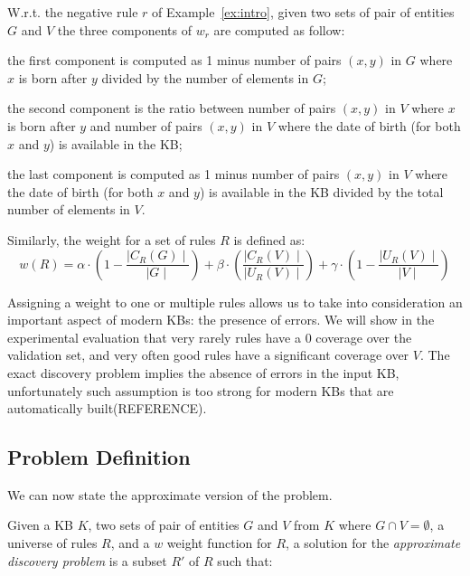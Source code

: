 \begin{myExample}
	W.r.t. the negative rule $r$ of Example~\ref{ex:intro}, given two sets of pair of entities $G$ and $V$ the three components of $w_r$ are computed as follow:
	\begin{inparaenum}[\itshape(i)]
		\item the first component is computed as 1 minus number of pairs $(x,y)$ in $G$ where
		$x$ is born after $y$ divided by the number of elements in $G$;
		\item the second component is the ratio between number of pairs $(x,y)$ in $V$ where $x$ is born after $y$ and number of pairs $(x,y)$ in $V$ where the date of birth (for both $x$ and $y$) is available in the KB;
		\item the last component is computed as 1 minus number of pairs $(x,y)$ in $V$ where the date of birth (for both $x$ and $y$) is available in the KB divided by the total number of elements in $V$.
	\end{inparaenum}
	\end{myExample}


Similarly, the weight for a set of rules $R$ is defined as:
\begin{equation*}
w(R) = \alpha \cdot (1-\frac{\mid C_{R}(G)\mid}{\mid G \mid}) +\beta \cdot (\frac{\mid C_{R}(V) \mid}{\mid U_{R}(V)\mid})  +\gamma \cdot (1-\frac{\mid U_{R}(V)\mid}{\mid V \mid})
\end{equation*}

Assigning a weight to one or multiple rules allows us to take into consideration an important aspect of modern KBs: the presence of errors. We will show in the experimental evaluation that very rarely rules have a $0$ coverage over the validation set, and very often good rules have a significant coverage over $V$. The exact discovery problem implies the absence of errors in the input KB, unfortunately such assumption is too strong for modern KBs that are automatically built(REFERENCE).

\subsection{Problem Definition}
We can now state the approximate version of the problem.


Given a KB $K$, two sets of pair of entities $G$ and $V$ from $K$ where $G \cap V = \emptyset$, a universe of rules $R$, and a $w$ weight function for $R$,
a solution for the \emph{approximate discovery problem} is a subset $R'$ of $R$  such that:

